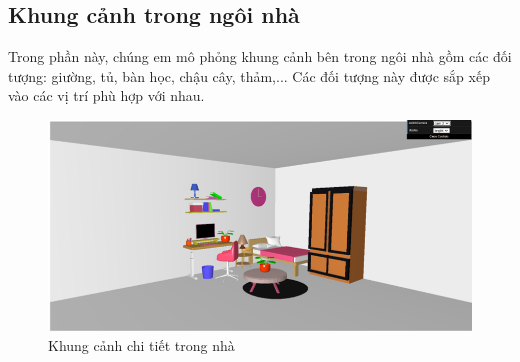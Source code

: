 \subsection{Khung cảnh trong ngôi nhà}
Trong phần này, chúng em mô phỏng khung cảnh bên trong ngôi nhà gồm các đối tượng: giường, tủ, bàn học, chậu cây, thảm,... Các đối tượng này được sắp xếp vào các vị trí phù hợp với nhau.
\begin{center}
    \begin{figure}[!h]
        \centering
        \includegraphics[scale = 0.7]{contents/trong nhÃ .png}
        \caption{Khung cảnh chi tiết trong nhà}
    \end{figure}
\end{center}
